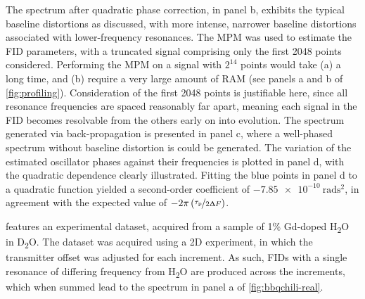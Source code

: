 The spectrum after quadratic phase correction, in panel b, exhibits the typical
baseline distortions as discussed, with more intense, narrower baseline
distortions associated with lower-frequency resonances.
The \ac{MPM} was used to estimate the \ac{FID} parameters,
with a truncated signal comprising only the first 2048 points considered.
Performing the \ac{MPM} on a signal with $2^{14}$ points would take (a) a long
time, and (b) require a very large amount of \ac{RAM} (see panels a and b of
\cref{fig:profiling}).
Consideration of the first 2048 points is justifiable here, since all
resonance frequencies are spaced reasonably far apart, meaning each signal in
the \ac{FID} becomes resolvable from the others early on into evolution.
The spectrum generated via back-propagation is presented in panel c, where a
well-phased spectrum without baseline distortion is could be generated.
The variation of the estimated oscillator phases against their frequencies is
plotted in panel d, with the quadratic dependence clearly illustrated.
Fitting the blue points in panel d to a quadratic function yielded a
second-order coefficient of $\qty{-7.85e-10}{\radian\second\squared}$, in
agreement with the expected value of $-2 \pi \left(\nicefrac{\tau_{\text{p}}}{2
\Updelta F}\right)$.

 features an experimental dataset, acquired
from a sample of 1\% Gd-doped H\textsubscript{2}O in D\textsubscript{2}O.
The dataset was acquired using a \ac{2D} experiment, in which the transmitter
offset was adjusted for each increment. As such, \acp{FID} with a single
resonance of differing frequency from H\textsubscript{2}O are produced across
the increments, which when summed lead to the spectrum in panel a of
\cref{fig:bbqchili-real}.

